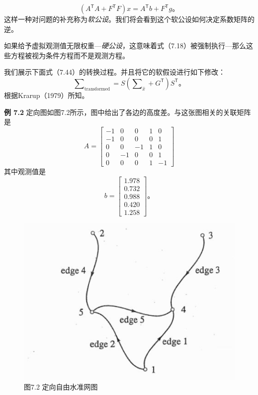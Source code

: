 \begin{equation}
	(A^\mathsf{T}A + F^\mathsf{T}F)x
	=A^\mathsf{T}b + F^\mathsf{T}g \text{。}
\end{equation}
这样一种对问题的补充称为\emph{软公设}。我们将会看到这个软公设如何决定系数矩阵的逆。
\par
如果给予虚拟观测值无限权重—\emph{硬公设}，这意味着式（7.18）被强制执行—那么这些方程被视为条件方程而不是观测方程。
\par
我们展示下面式（7.44）的转换过程。并且将它的软假设进行如下修改：
\begin{equation}
	\sum\nolimits_ {\text{transformed}}
	=S(\sum\nolimits_{\hat{x}} + G^\mathsf{T})S^\mathsf{T}\text{。}
\end{equation}
根据Krarup（1979）所知。
\par\noindent
\textbf{例 7.2} 定向图如图7.2所示，图中给出了各边的高度差。与这张图相关的关联矩阵是
\begin{equation*}
	A
	=
	\begin{bmatrix}
		-1 & 0 & 0 & 1 & 0\\
		-1 & 0 & 0 & 0 & 1\\
		0 & 0 &-1 & 1 & 0\\
		0 &-1 & 0 & 0 & 1\\
		0 & 0 & 0 & 1 & -1
	\end{bmatrix}
\end{equation*}
其中观测值是
\begin{equation*}
	b
	=
	\begin{bmatrix}
		1.978\\
		0.732\\
		0.988\\
		0.420\\
		1.258
	\end{bmatrix}\text{。}
\end{equation*}
\begin{figure}
	\centering
	\includegraphics[width=0.4\linewidth]{TeX_files/Part02/chapter07/image/7-2}
	\caption{图7.2 定向自由水准网图}
	\label{fig:7-2}
\end{figure}

